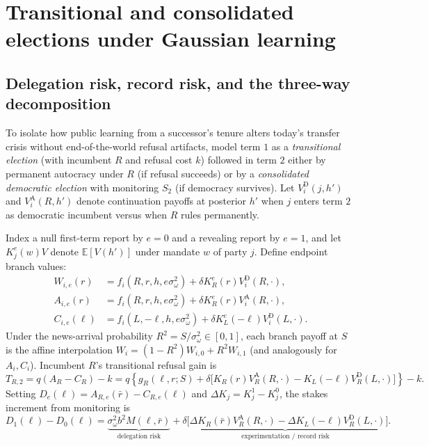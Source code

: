 \documentclass[11pt,letterpaper]{article}
\newcommand{\E}{\mathbb E}
\newcommand{\D}{\mathrm D}
\newcommand{\A}{\mathrm A}
\begin{document}
\section{Transitional and consolidated elections under Gaussian learning}\label{sec:two}

\subsection{Delegation risk, record risk, and the three-way decomposition}

To isolate how public learning from a successor's tenure alters today's transfer crisis without end-of-the-world refusal artifacts, model term $1$ as a \emph{transitional election} (with incumbent $R$ and refusal cost $k$) followed in term $2$ either by permanent autocracy under $R$ (if refusal succeeds) or by a \emph{consolidated democratic election} with monitoring $S_2$ (if democracy survives). Let $V_i^\D(j,h')$ and $V_i^\A(R,h')$ denote continuation payoffs at posterior $h'$ when $j$ enters term $2$ as democratic incumbent versus when $R$ rules permanently.

Index a null first-term report by $e=0$ and a revealing report by $e=1$, and let $K_j^e(w)V$ denote $\E[V(h')]$ under mandate $w$ of party $j$. Define endpoint branch values:
\begin{align}
 W_{i,e}(r)&=f_i(R,r,h,e\sigma_\omega^2)+\delta K_R^e(r)V_i^\D(R,\cdot),\nonumber\\
 A_{i,e}(r)&=f_i(R,r,h,e\sigma_\omega^2)+\delta K_R^e(r)V_i^\A(R,\cdot),\nonumber\\
 C_{i,e}(\ell)&=f_i(L,-\ell,h,e\sigma_\omega^2)+\delta K_L^e(-\ell)V_i^\D(L,\cdot).
 \label{eq:endpointvalues}
\end{align}
Under the news-arrival probability $R^2=S/\sigma_\omega^2\in[0,1]$, each branch payoff at $S$ is the affine interpolation $W_i=(1-R^2)W_{i,0}+R^2 W_{i,1}$ (and analogously for $A_i,C_i$). Incumbent $R$'s transitional refusal gain is
\begin{equation}
 T_{R,2}=q(A_R-C_R)-k
 =q\left\{g_R(\ell,r;S)+\delta
       \big[K_R(r)V_R^\A(R,\cdot)-K_L(-\ell)V_R^\D(L,\cdot)\big]\right\}-k .
 \label{eq:twogain}
\end{equation}
Setting $D_e(\ell)=A_{R,e}(\bar r)-C_{R,e}(\ell)$ and $\Delta K_j=K_j^1-K_j^0$, the stakes increment from monitoring is
\begin{equation}
 D_1(\ell)-D_0(\ell)=
 \underbrace{\sigma_\omega^2 b^2 M(\ell,\bar r)}_{\text{delegation risk}}
 +\underbrace{\delta\big[\Delta K_R(\bar r) V_R^\A(R,\cdot)-\Delta K_L(-\ell) V_R^\D(L,\cdot)\big]}_{\text{experimentation / record risk}}.
 \label{eq:twodecomposition}
\end{equation}
\end{document}
